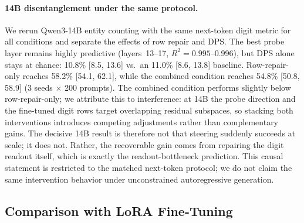 \documentclass{article}
\begin{document}
\paragraph{14B disentanglement under the same protocol.}
We rerun Qwen3-14B entity counting with the same next-token digit metric for all
conditions and separate the effects of row repair and DPS. The best probe layer
remains highly predictive (layers~13--17, $R^2 = 0.995$--0.996), but DPS alone
stays at chance: 10.8\% [8.5, 13.6] vs.\ an 11.0\% [8.6, 13.8] baseline.
Row-repair-only reaches 58.2\% [54.1, 62.1], while the combined condition reaches
54.8\% [50.8, 58.9] (3 seeds $\times$ 200 prompts). The combined condition
performs slightly below row-repair-only; we attribute this to interference: at
14B the probe direction and the fine-tuned digit rows target overlapping residual
subspaces, so stacking both interventions introduces competing adjustments rather
than complementary gains. The decisive 14B result is therefore not that steering
suddenly succeeds at scale; it does not. Rather, the recoverable gain comes from
repairing the digit readout itself, which is exactly the readout-bottleneck
prediction.
This causal statement is restricted to the matched next-token protocol; we do not
claim the same intervention behavior under unconstrained autoregressive generation.

\subsection{Comparison with LoRA Fine-Tuning}
\end{document}

